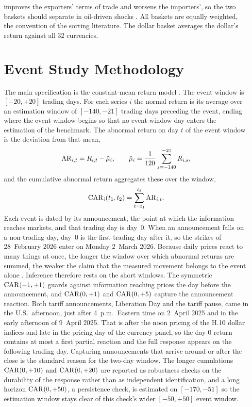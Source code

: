 improves the exporters' terms of trade and worsens the importers', so the two baskets should separate in oil-driven shocks \parencite{chen_rogoff_2003,chen_liu_wang_zhu_2016}. All baskets are equally weighted, the convention of the sorting literature. The dollar basket averages the dollar's return against all 32 currencies.

\section{Event Study Methodology}
\label{sec:method_event}

The main specification is the constant-mean return model \parencite{mackinlay_1997,campbell_lo_mackinlay_1997}. The event window is $[-20,+20]$ trading days. For each series $i$ the normal return is its average over an estimation window of $[-140,-21]$ trading days preceding the event, ending where the event window begins so that no event-window day enters the estimation of the benchmark. The abnormal return on day $t$ of the event window is the deviation from that mean,
\begin{equation}
  \label{eq:abnormal_return}
  \mathrm{AR}_{i,t} = R_{i,t} - \hat\mu_i, \qquad
  \hat\mu_i = \frac{1}{120}\sum_{s=-140}^{-21} R_{i,s},
\end{equation}
and the cumulative abnormal return aggregates these over the window,
\begin{equation*}
  \mathrm{CAR}_i(t_1,t_2) = \sum_{t=t_1}^{t_2} \mathrm{AR}_{i,t}.
\end{equation*}
Each event is dated by its announcement, the point at which the information reaches markets, and that trading day is day~0. When an announcement falls on a non-trading day, day~0 is the first trading day after it, so the strikes of 28~February 2026 enter on Monday 2~March 2026. Because daily prices react to many things at once, the longer the window over which abnormal returns are summed, the weaker the claim that the measured movement belongs to the event alone \parencite{mackinlay_1997, kothari_warner_2007}. Inference therefore rests on the short windows. The symmetric $\mathrm{CAR}(-1,+1)$ guards against information reaching prices the day before the announcement, and $\mathrm{CAR}(0,+1)$ and $\mathrm{CAR}(0,+5)$ capture the announcement reaction. Both tariff announcements, Liberation Day and the tariff pause, came in the U.S.\ afternoon, just after 4~p.m.\ Eastern time on 2~April 2025 \parencite{benguria_saffie_2025} and in the early afternoon of 9~April 2025. That is after the noon pricing of the H.10 dollar indices and late in the pricing day of the currency panel, so the day-0 return contains at most a first partial reaction and the full response appears on the following trading day. Capturing announcements that arrive around or after the close is the standard reason for the two-day window. The longer cumulations $\mathrm{CAR}(0,+10)$ and $\mathrm{CAR}(0,+20)$ are reported as robustness checks on the durability of the response rather than as independent identification, and a long horizon $\mathrm{CAR}(0,+50)$, a persistence check, is estimated on $[-170,-51]$ so the estimation window stays clear of this check's wider $[-50,+50]$ event window.

